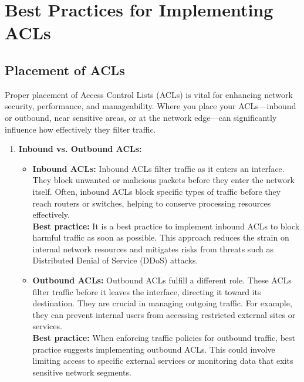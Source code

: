\documentclass[11pt,a4paper]{article}
\begin{document}
\section*{Best Practices for Implementing ACLs}
    \subsection*{Placement of ACLs}
        Proper placement of Access Control Lists (ACLs) is vital for enhancing network security, performance, and manageability. Where you place your ACLs—inbound or outbound, near sensitive areas, or at the network edge—can significantly influence how effectively they filter traffic.

        \begin{enumerate}
            \item \textbf{Inbound vs. Outbound ACLs:}
                \begin{itemize}
                    \item \textbf{Inbound ACLs:} Inbound ACLs filter traffic as it enters an interface. They block unwanted or malicious packets before they enter the network itself. Often, inbound ACLs block specific types of traffic before they reach routers or switches, helping to conserve processing resources effectively.
                    \\[1em]
                    \textbf{Best practice:} It is a best practice to implement inbound ACLs to block harmful traffic as soon as possible. This approach reduces the strain on internal network resources and mitigates risks from threats such as Distributed Denial of Service (DDoS) attacks.
                    \\[1em]
                    \item \textbf{Outbound ACLs:} Outbound ACLs fulfill a different role. These ACLs filter traffic before it leaves the interface, directing it toward its destination. They are crucial in managing outgoing traffic. For example, they can prevent internal users from accessing restricted external sites or services.
                    \\[1em]
                    \textbf{Best practice:} When enforcing traffic policies for outbound traffic, best practice suggests implementing outbound ACLs. This could involve limiting access to specific external services or monitoring data that exits sensitive network segments.


\end{itemize}
\end{enumerate}
\end{document}
